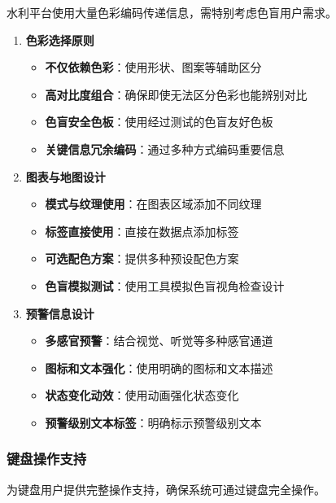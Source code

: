 水利平台使用大量色彩编码传递信息，需特别考虑色盲用户需求。

\begin{enumerate}
\def\labelenumi{\arabic{enumi}.}
\tightlist
\item
  \textbf{色彩选择原则}

  \begin{itemize}
  \tightlist
  \item
    \textbf{不仅依赖色彩}：使用形状、图案等辅助区分
  \item
    \textbf{高对比度组合}：确保即使无法区分色彩也能辨别对比
  \item
    \textbf{色盲安全色板}：使用经过测试的色盲友好色板
  \item
    \textbf{关键信息冗余编码}：通过多种方式编码重要信息
  \end{itemize}
\item
  \textbf{图表与地图设计}

  \begin{itemize}
  \tightlist
  \item
    \textbf{模式与纹理使用}：在图表区域添加不同纹理
  \item
    \textbf{标签直接使用}：直接在数据点添加标签
  \item
    \textbf{可选配色方案}：提供多种预设配色方案
  \item
    \textbf{色盲模拟测试}：使用工具模拟色盲视角检查设计
  \end{itemize}
\item
  \textbf{预警信息设计}

  \begin{itemize}
  \tightlist
  \item
    \textbf{多感官预警}：结合视觉、听觉等多种感官通道
  \item
    \textbf{图标和文本强化}：使用明确的图标和文本描述
  \item
    \textbf{状态变化动效}：使用动画强化状态变化
  \item
    \textbf{预警级别文本标签}：明确标示预警级别文本
  \end{itemize}
\end{enumerate}

\subsubsection{键盘操作支持}\label{ux952eux76d8ux64cdux4f5cux652fux6301}

为键盘用户提供完整操作支持，确保系统可通过键盘完全操作。

